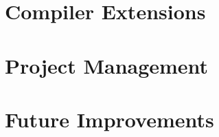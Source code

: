 \documentclass{article}
\begin{document}
    \section*{Compiler Extensions}

    
    \section*{Project Management}

    \section*{Future Improvements}
\end{document}
